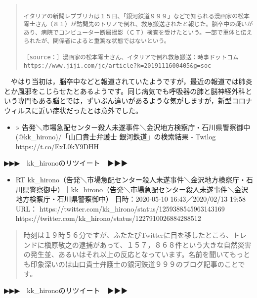 \documentclass[]{ltjarticle}
\providecommand{\tightlist}{%
  \setlength{\itemsep}{0pt}\setlength{\parskip}{0pt}}
\begin{document}
\begingroup\fontsize{9pt}{10pt}\selectfont
\begin{quote}
\begin{verbatim}

イタリアの新聞レプブリカは１５日、「銀河鉄道９９９」などで知られる漫画家の松本零士さん（８１）が訪問先のトリノで倒れ、救急搬送されたと報じた。脳卒中の疑いがあり、病院でコンピューター断層撮影（ＣＴ）検査を受けたという。一部で重体と伝えられたが、関係者によると重篤な状態ではないという。

［source：］漫画家の松本零士さん、イタリアで倒れ救急搬送：時事ドットコム https://www.jiji.com/jc/article?k=2019111600405&g=soc

\end{verbatim}
\end{quote}\endgroup


　やはり当初は，脳卒中などと報道されていたようですが，最近の報道では肺炎とか風邪をこじらせたとあるようです。同じ病気でも呼吸器の肺と脳神経外科という専門もある脳とでは，ずいぶん違いがあるような気がしますが，新型コロナウィルスに近い症状だったとは意外でした。

\begin{itemize}
\tightlist
\item
  »
  告発＼市場急配センター殺人未遂事件＼金沢地方検察庁・石川県警察御中(@kk\_hirono)/「山口貴士弁護士
  銀河鉄道」の検索結果 - Twilog https://t.co/ExL0kY9DHH
\end{itemize}

▶▶▶　kk\_hironoのリツイート　▶▶▶

\begin{itemize}
\tightlist
\item
  RT
  kk\_hirono（告発＼市場急配センター殺人未遂事件＼金沢地方検察庁・石川県警察御中）｜kk\_hirono（告発＼市場急配センター殺人未遂事件＼金沢地方検察庁・石川県警察御中）
  日時：2020-05-10 16:43／2020/02/13 19:58 URL：
  https://twitter.com/kk\_hirono/status/1259388545963143169
  https://twitter.com/kk\_hirono/status/1227910026884288512
\end{itemize}

\begin{quote}
時刻は１９時５６分ですが、ふたたびTwitterに目を移したところ、トレンドに槇原敬之の逮捕があって、１５７，８６８件という大きな自然災害の発生並、あるいはそれ以上の反応となっています。名前を聞いてもっとも印象深いのは山口貴士弁護士の銀河鉄道９９９のブログ記事のことです。
\end{quote}

▶▶▶　kk\_hironoのリツイート　▶▶▶
\end{document}
